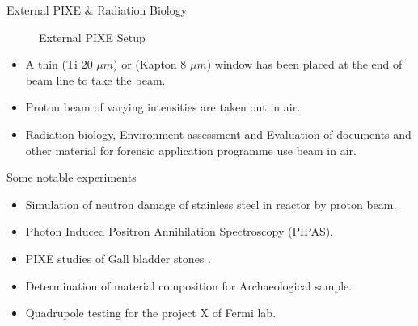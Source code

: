 \documentclass[11pt]{beamer}
\begin{document}
\begin{frame}{External PIXE \& Radiation Biology}
\begin{figure}
        \caption{External PIXE Setup}\label{fig:External PIXE Setup}
\end{figure}
  
  
  \begin{itemize}
     
    
    \item A thin (Ti 20 $\mu m$) or (Kapton 8 $\mu m$) window has been placed at the end of beam line to take the beam. 
	\item Proton beam of varying intensities are taken out in air.
	\item Radiation biology, Environment assessment and Evaluation of documents and other material for forensic application  programme use beam in air.
	           
   \end{itemize}


\end{frame}


\begin{frame}{Some notable experiments}
  
  
  \begin{itemize}
     
    
    \item Simulation of neutron damage of stainless steel in reactor by proton beam. 
	\item Photon Induced Positron Annihilation Spectroscopy (PIPAS).
	\item PIXE studies of Gall bladder stones .
	\item Determination of material composition for Archaeological sample.
	\item Quadrupole testing for the project X of Fermi lab.          
   \end{itemize}


\end{frame}
\end{document}
